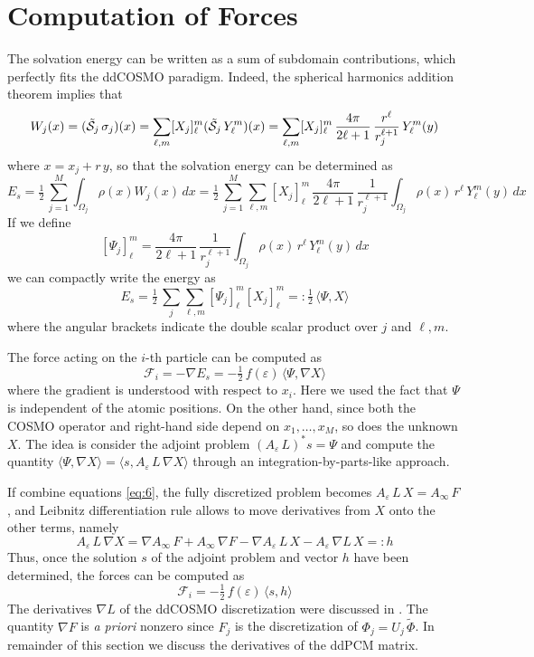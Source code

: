 \section{Computation of Forces}\label{sec:forces}
The solvation energy can be written as a sum of subdomain contributions, which perfectly fits the ddCOSMO paradigm. 
Indeed, the spherical harmonics addition theorem implies that
\[
W_j(x) = (\tilde{\mathcal{S}}_j \, \sigma_j)(x) = \sum_{\ell,m} [X_j]_\ell^m (\tilde{\mathcal{S}}_j \, Y_\ell^m)(x) = \sum_{\ell,m} [X_j]_\ell^m \, \frac{4\pi}{2\ell+1} \,\frac{r^\ell}{r_j^{\ell+1}} \, Y_\ell^m(y)
\]
where $x = x_j + r\, y$, so that the solvation energy can be determined as
\[
E_s = \tfrac{1}{2} 
\, \sum_{j=1}^M \int_{\Omega_j} \rho(x) W_j(x) \, dx = \tfrac{1}{2}
\, \sum_{j=1}^M \sum_{\ell,m} [X_j]_\ell^m \, \frac{4\pi}{2\ell+1} \,\frac{1}{r_j^{\ell+1}} 
\int_{\Omega_j} \rho(x) \, r^\ell \, Y_\ell^m(y) \, dx
\]
If we define
\[
[\Psi_j]_\ell^m = \frac{4\pi}{2\ell+1}\, \frac{1}{r_j^{\ell+1}}\int_{\Omega_j} \rho(x) \, r^\ell \, Y_\ell^m(y) \, dx
\]
we can compactly write the energy as
\[
E_s = \tfrac{1}{2}
 \, \sum_j \sum_{\ell,m} [\Psi_j]_\ell^m [X_j]_\ell^m
  =: \tfrac{1}{2} 
  \,\langle \Psi, X \rangle
\]
where the angular brackets indicate the double scalar product over $j$ and $\ell,m$.

The force acting on the $i$-th particle can be computed as
\[
\mathcal{F}_i = -\nabla E_s = - \tfrac{1}{2} \,f(\varepsilon) \,  \langle \Psi, \nabla X \rangle %
\]
where the gradient is understood with respect to $x_i$. Here we used the fact that $\Psi$ is independent of the atomic positions. On the other hand, since both the COSMO operator and right-hand side depend on $x_1 , \ldots, x_M$, so does the unknown $X$. The idea is consider the adjoint problem $(A_\varepsilon \, L)^* s = \Psi$ and compute the quantity $\langle \Psi, \nabla X \rangle = \langle s ,  A_\varepsilon \, L \, \nabla X\rangle$ through an integration-by-parts-like approach.

If combine equations \eqref{eq:6}, the fully discretized problem becomes $A_\varepsilon \, L \, X = A_\infty \, F$, and Leibnitz differentiation rule allows to move derivatives from $X$ onto the other terms, namely
\[
A_\varepsilon \, L \, \nabla X = \nabla A_\infty \, F +  A_\infty \, \nabla F - \nabla A_\varepsilon \, L \, X -  A_\varepsilon \, \nabla L \, X=: h
\]
Thus, once the solution $s$ of the adjoint problem and vector $h$ have been determined, the forces can be computed as
\[
\mathcal{F}_i =  - \tfrac{1}{2} \,f(\varepsilon) \,  \langle s, h \rangle
\]
The derivatives $\nabla L $ of the ddCOSMO discretization were discussed in \cite{}. The quantity $\nabla F$ is \emph{a priori} nonzero since $F_j$ is the discretization of $\Phi_j = U_j \, \tilde{\Phi}$. In remainder of this section we discuss the derivatives of the ddPCM matrix.

